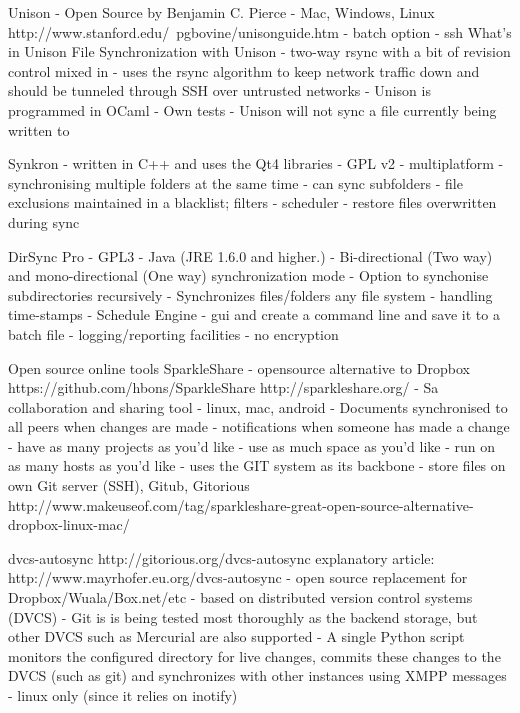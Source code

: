 			Unison
				- Open Source by Benjamin C. Pierce 
				- Mac, Windows, Linux
				http://www.stanford.edu/~pgbovine/unisonguide.htm
					- batch option
					- ssh
				What's in Unison
				File Synchronization with Unison
					- two-way rsync with a bit of revision control mixed in
					- uses the rsync algorithm to keep network traffic down and should be tunneled through SSH over untrusted networks
					- Unison is programmed in OCaml
				- Own tests
					- Unison will not sync a file currently being written to
					
			Synkron
				- written in C++ and uses the Qt4 libraries
				- GPL v2
				- multiplatform 
				- synchronising multiple folders at the same time
				- can sync subfolders
				- file exclusions maintained in a blacklist; filters
				- scheduler
				- restore files overwritten during sync
				
			DirSync Pro 
				- GPL3
				- Java (JRE 1.6.0 and higher.)
				- Bi-directional (Two way) and mono-directional (One way) synchronization mode
				- Option to synchonise subdirectories recursively
				- Synchronizes files/folders any file system
				- handling time-stamps
				- Schedule Engine
				- gui and create a command line and save it to a batch file
				- logging/reporting facilities
				- no encryption
				
		Open source online tools
			SparkleShare 
				- opensource alternative to Dropbox
				https://github.com/hbons/SparkleShare
				http://sparkleshare.org/
					- Sa collaboration and sharing tool 
					- linux, mac, android
					- Documents synchronised to all peers when changes are made
					- notifications when someone has made a change
					- have as many projects as you'd like
					- use as much space as you'd like
					- run on as many hosts as you'd like
					- uses the GIT system as its backbone
					- store files on own Git server (SSH), Gitub, Gitorious
				http://www.makeuseof.com/tag/sparkleshare-great-open-source-alternative-dropbox-linux-mac/
				
			dvcs-autosync
				http://gitorious.org/dvcs-autosync
				explanatory article: http://www.mayrhofer.eu.org/dvcs-autosync
					- open source replacement for Dropbox/Wuala/Box.net/etc
					- based on distributed version control systems (DVCS)
					- Git is is being tested most thoroughly as the backend storage, but other DVCS such as Mercurial are also supported
					- A single Python script monitors the configured directory for live changes, commits these changes to the DVCS (such as git) and synchronizes with other instances using XMPP messages
					- linux only (since it relies on inotify)
					
